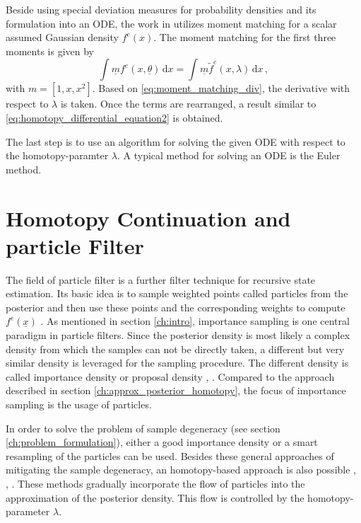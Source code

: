 \documentclass[a4paper]{IEEEtran}
\begin{document}
Beside using special deviation measures for probability densities and its formulation into an ODE, the work in \cite{hanebeck2012a} utilizes moment matching for a scalar assumed Gaussian density $f^{e}(x)$. 
The moment matching for the first three moments is given by
\begin{equation}
    \int \underline{m}f^{e}(x,\underline{\theta}) \, \mathrm{d} x = \int \underline{m} \tilde{f}^{e}(x, \lambda) \, \mathrm{d} x \,,
    \label{eq:moment_matching_div}
\end{equation}
with $m = \left[ 1, x, x^2 \right]$. Based on \eqref{eq:moment_matching_div}, the derivative with respect to $\lambda$ is taken. Once the terms are rearranged, a result similar to \eqref{eq:homotopy_differential_equation2} is obtained.

The last step is to use an algorithm for solving the given ODE with respect to the homotopy-paramter $\lambda$. A typical method for solving an ODE is the Euler method. 

\section{Homotopy Continuation and particle Filter}
\label{ch:homotopy_particle_filter}

The field of particle filter is a further filter technique for recursive state estimation. Its basic idea is to sample weighted points called particles from the
posterior and then use these points and the corresponding weights to compute $f^{e}(\underline{x})$ \cite{arulampalam2002}. 
As mentioned in section \ref{ch:intro}, importance sampling is one central paradigm in particle filters. Since the posterior density is most likely a complex density from which the samples can not be directly taken,  a different but very similar density is leveraged for the sampling procedure.
The different density is called importance density or proposal density \cite{daum2005}, \cite{chlebek2016a}. Compared to the approach described in section \ref{ch:approx_posterior_homotopy}, the focus of importance sampling is the usage of particles. 

In order to solve the problem of sample degeneracy (see section \ref{ch:problem_formulation}), either a good importance density or a smart resampling of the particles can be used. Besides these general approaches of mitigating the sample degeneracy, an homotopy-based approach is also possible \cite{chlebek2016a}, \cite{bunch2013a}, \cite{daum2013a}. 
These methods gradually incorporate the flow of particles into the approximation of the posterior density. This flow is controlled by the homotopy-parameter $\lambda$.
\end{document}

